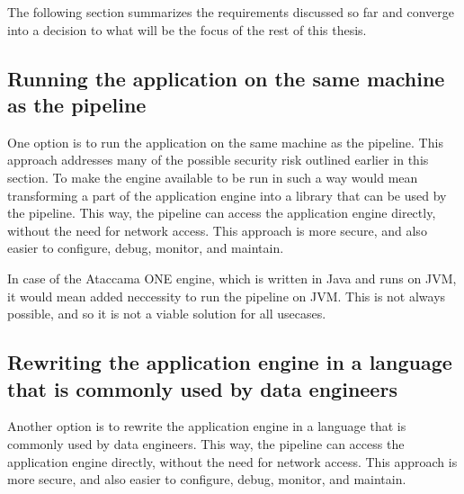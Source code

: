 The following section summarizes the requirements discussed so far and converge into a decision to what will be the focus of the rest of this thesis.

\subsection{Running the application on the same machine as the pipeline}

One option is to run the application on the same machine as the pipeline. This approach addresses many of the possible security risk outlined earlier in this section. To make the engine available to be run in such a way would mean transforming a part of the application engine into a library that can be used by the pipeline. This way, the pipeline can access the application engine directly, without the need for network access. This approach is more secure, and also easier to configure, debug, monitor, and maintain.

In case of the Ataccama ONE engine, which is written in Java and runs on JVM, it would mean added neccessity to run the pipeline on JVM. This is not always possible, and so it is not a viable solution for all usecases. 

\subsection{Rewriting the application engine in a language that is commonly used by data engineers}

Another option is to rewrite the application engine in a language that is commonly used by data engineers. This way, the pipeline can access the application engine directly, without the need for network access. This approach is more secure, and also easier to configure, debug, monitor, and maintain.
